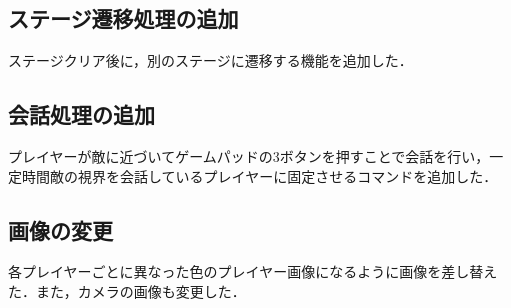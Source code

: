 \documentclass{jarticle}
\newcommand{\xf}{ステージ遷移処理の追加}
\newcommand{\xg}{会話処理の追加}
\newcommand{\xh}{画像の変更}
\begin{document}
\subsection{\xf}
ステージクリア後に，別のステージに遷移する機能を追加した．

\subsection{\xg}
プレイヤーが敵に近づいてゲームパッドの3ボタンを押すことで会話を行い，一定時間敵の視界を会話しているプレイヤーに固定させるコマンドを追加した．　

\subsection{\xh}
各プレイヤーごとに異なった色のプレイヤー画像になるように画像を差し替えた．また，カメラの画像も変更した．
\end{document}
